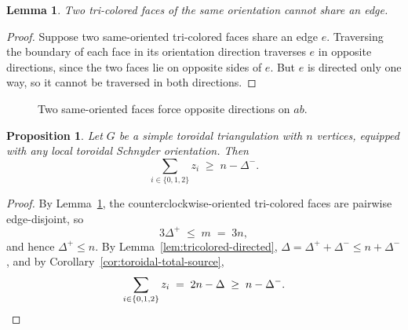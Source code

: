 \documentclass[11pt]{amsart}
\newcommand{\Zthree}{\{0,1,2\}}
\theoremstyle{plain}
\newtheorem{proposition}[theorem]{Proposition}
\newtheorem{lemma}[theorem]{Lemma}
\theoremstyle{definition}
\theoremstyle{remark}
\begin{document}
\begin{lemma}
\label{lem:tricolored-edge-disjoint}
Two tri-colored faces of the same orientation cannot share an edge.
\end{lemma}

\begin{proof}
Suppose two same-oriented tri-colored faces share an edge $e$. Traversing the boundary of each face in its orientation direction traverses $e$ in opposite directions, since the two faces lie on opposite sides of $e$. But $e$ is directed only one way, so it cannot be traversed in both directions.
\end{proof}

\begin{figure}[H]
\centering
{}
\caption{Two same-oriented faces force opposite directions on $ab$.}
\label{fig:edge-disjoint-contradiction}
\end{figure}

\begin{proposition}
\label{prop:general-source-bound}
Let $G$ be a simple toroidal triangulation with $n$ vertices, equipped with any local toroidal Schnyder orientation. Then
\[
  \sum_{i \in \Zthree} z_i \;\geq\; n - \Delta^-.
\]
\end{proposition}

\begin{proof}
By Lemma~\ref{lem:tricolored-edge-disjoint}, the counterclockwise-oriented tri-colored faces are pairwise edge-disjoint, so
\[
  3 \Delta^+ \;\leq\; m \;=\; 3n,
\]
and hence $\Delta^+ \leq n$. By Lemma~\ref{lem:tricolored-directed}, $\Delta = \Delta^+ + \Delta^- \leq n + \Delta^-$, and by Corollary~\ref{cor:toroidal-total-source},
\[
  \sum_{i \in \Zthree} z_i \;=\; 2n - \Delta \;\geq\; n - \Delta^-. \qedhere
\]
\end{proof}
\end{document}
